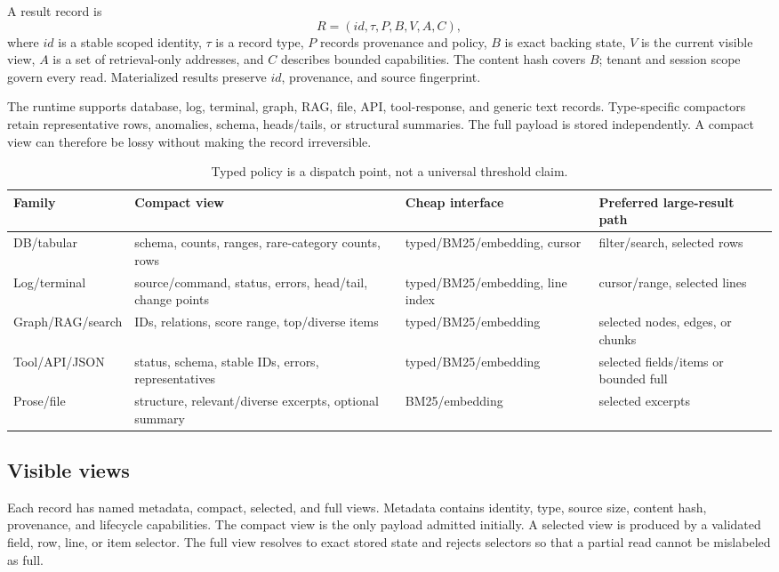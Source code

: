 \documentclass[11pt]{article}
\begin{document}
A result record is
\begin{equation}
R=(id,\tau,P,B,V,A,C),
\end{equation}
where $id$ is a stable scoped identity, $\tau$ is a record type, $P$ records
provenance and policy, $B$ is exact backing state, $V$ is the current visible
view, $A$ is a set of retrieval-only addresses, and $C$ describes bounded
capabilities. The content hash covers $B$; tenant and session scope govern every
read. Materialized results preserve $id$, provenance, and source fingerprint.

The runtime supports database, log, terminal, graph, RAG, file, API,
tool-response, and generic text records. Type-specific compactors retain
representative rows, anomalies, schema, heads/tails, or structural summaries.
The full payload is stored independently. A compact view can therefore be
lossy without making the record irreversible.

\begin{table}[t]
\centering
\small
\begin{tabularx}{\linewidth}{@{}lXXX@{}}
\toprule
Family & Compact view & Cheap interface & Preferred large-result path\\
\midrule
DB/tabular & schema, counts, ranges, rare-category counts, rows & typed/BM25/embedding, cursor & filter/search, selected rows\\
Log/terminal & source/command, status, errors, head/tail, change points & typed/BM25/embedding, line index & cursor/range, selected lines\\
Graph/RAG/search & IDs, relations, score range, top/diverse items & typed/BM25/embedding & selected nodes, edges, or chunks\\
Tool/API/JSON & status, schema, stable IDs, errors, representatives & typed/BM25/embedding & selected fields/items or bounded full\\
Prose/file & structure, relevant/diverse excerpts, optional summary & BM25/embedding & selected excerpts\\
\bottomrule
\end{tabularx}
\caption{Typed policy is a dispatch point, not a universal threshold claim.}
\label{tab:record-families}
\end{table}

\subsection{Visible views}

Each record has named metadata, compact, selected, and full views. Metadata
contains identity, type, source size, content hash, provenance, and lifecycle
capabilities. The compact view is the only payload admitted initially. A
selected view is produced by a validated field, row, line, or item selector.
The full view resolves to exact stored state and rejects selectors so that a
partial read cannot be mislabeled as full.
\end{document}
